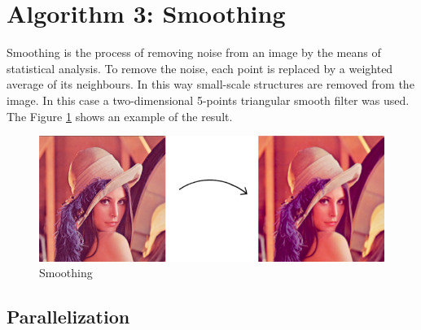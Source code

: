 \documentclass[a4paper]{article}
\begin{document}
\section{Algorithm 3: Smoothing}
\label{sec:smoo}
Smoothing is the process of removing noise from an image by the means of statistical analysis. To remove the noise, each point is replaced by a weighted average of its neighbours. In this way small-scale structures are removed from the image. In this case a two-dimensional 5-points triangular smooth filter was used. The Figure \ref{fig:smooth} shows an example of the result.

\begin{figure}[!ht]
    \centering
    \includegraphics[width=0.5\linewidth]{smooth}
    \caption{Smoothing}
    \label{fig:smooth}
\end{figure}
\FloatBarrier


\subsection{Parallelization}
\label{sec:p3}
\end{document}
